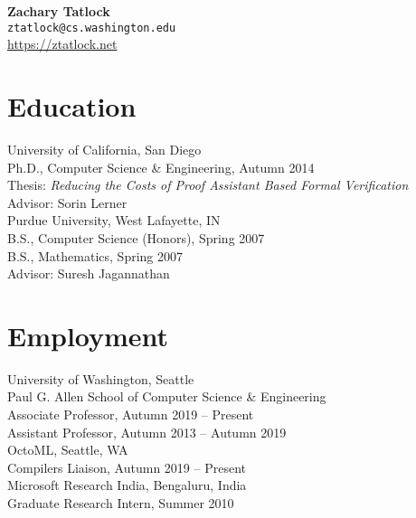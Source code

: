 \documentclass[10pt]{article}
\begin{document}
{\LARGE \textbf{Zachary Tatlock}} \\
\texttt{ztatlock@cs.washington.edu} \\
\url{https://ztatlock.net}

\section*{Education}

University of California, San Diego \\
Ph.D., Computer Science \& Engineering, Autumn 2014 \\
Thesis: \textit{Reducing the Costs of Proof Assistant Based Formal Verification} \\
Advisor: Sorin Lerner \\

Purdue University, West Lafayette, IN \\
B.S., Computer Science (Honors), Spring 2007 \\
B.S., Mathematics, Spring 2007 \\
Advisor: Suresh Jagannathan


\section*{Employment}

University of Washington, Seattle \\
Paul G. Allen School of Computer Science \& Engineering \\
Associate Professor, Autumn 2019 -- Present \\
Assistant Professor, Autumn 2013 -- Autumn 2019 \\

OctoML, Seattle, WA \\
Compilers Liaison, Autumn 2019 -- Present \\


Microsoft Research India, Bengaluru, India \\
Graduate Research Intern, Summer 2010 %
\end{document}

